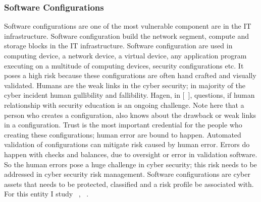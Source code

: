 \subsubsection{Software Configurations}\label{sec:asset_swconfig}
Software configurations are one of the most vulnerable component are in the IT infrastructure. Software configuration build the network segment, compute and storage blocks in the IT infrastructure. Software configuration are used in computing device, a network device, a virtual device, any application program executing on a multitude of computing devices, security configurations etc. It poses a high risk because these configurations are often hand crafted and visually validated. Humans are the weak links in the cyber security; in majority of the cyber incident human gullibility and fallibility. Hagen, in [~\cite{5189564}], questions, if human relationship with security education is an ongoing challenge. Note here that a person who creates a configuration, also knows about the drawback or weak links in a configuration. Trust is the most important credential for the people who creating these configurations; human error are bound to happen. Automated validation of configurations can mitigate risk caused by human error. Errors do happen with checks and balances, due to oversight or error in validation software. So the human errors pose a huge challenge in cyber security; this risk needs to be addressed in cyber security risk management. Software configurations are cyber assets that needs to be protected, classified and a risk profile be associated with. For this entity I study ~\cite{7795460}, ~\cite{6061419}.\\ 
